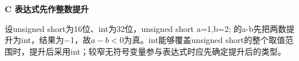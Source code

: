{\color{ink}\bfseries C 表达式先作整数提升}\par\vspace{1bp}设unsigned short为16位、int为32位，unsigned short a=\allowbreak{}1,\allowbreak{}b=\allowbreak{}2;\allowbreak{} 的a-b先把两数提升为int，结果为\(-\)1，故\(a-b<\allowbreak{}0\)为真。int能够覆盖unsigned short的整个取值范围时，提升后采用int；较窄无符号变量参与表达式时应先确定提升后的类型。
